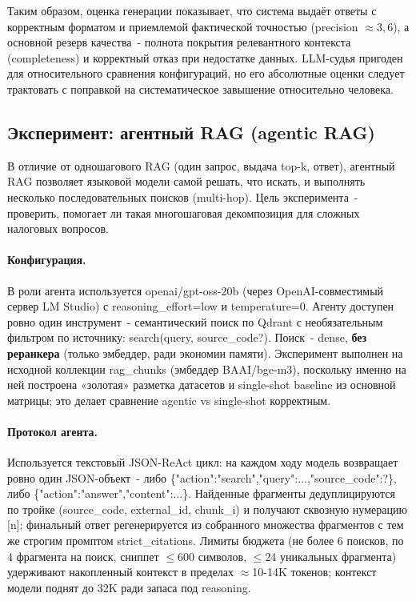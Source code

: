 \documentclass[a4paper,12pt]{article}
\begin{document}
Таким образом, оценка генерации показывает, что система выдаёт ответы с корректным форматом и приемлемой фактической точностью (precision $\approx 3{,}6$), а основной резерв качества~- полнота покрытия релевантного контекста (completeness) и корректный отказ при недостатке данных. LLM-судья пригоден для относительного сравнения конфигураций, но его абсолютные оценки следует трактовать с поправкой на систематическое завышение относительно человека.

\subsection{Эксперимент: агентный RAG (agentic RAG)}
\label{sec:agentic}

В отличие от одношагового RAG (один запрос, выдача top-k, ответ), агентный RAG позволяет языковой модели самой решать, что искать, и выполнять несколько последовательных поисков (multi-hop). Цель эксперимента~- проверить, помогает ли такая многошаговая декомпозиция для сложных налоговых вопросов.

\paragraph{Конфигурация.} В роли агента используется openai/gpt-oss-20b (через OpenAI-совместимый сервер LM Studio) с reasoning\_effort=low и temperature=0. Агенту доступен ровно один инструмент~- семантический поиск по Qdrant с необязательным фильтром по источнику: search(query, source\_code?). Поиск~- dense, \textbf{без реранкера} (только эмбеддер, ради экономии памяти). Эксперимент выполнен на исходной коллекции rag\_chunks (эмбеддер BAAI/bge-m3), поскольку именно на ней построена «золотая» разметка датасетов и single-shot baseline из основной матрицы; это делает сравнение agentic vs single-shot корректным.

\paragraph{Протокол агента.} Используется текстовый JSON-ReAct цикл: на каждом ходу модель возвращает ровно один JSON-объект~- либо \{"action":"search","query":...,"source\_code":?\}, либо \{"action":"answer","content":...\}. Найденные фрагменты дедуплицируются по тройке (source\_code, external\_id, chunk\_i) и получают сквозную нумерацию [n]; финальный ответ регенерируется из собранного множества фрагментов с тем же строгим промптом strict\_citations. Лимиты бюджета (не более 6 поисков, по 4 фрагмента на поиск, сниппет $\le$600 символов, $\le$24 уникальных фрагмента) удерживают накопленный контекст в пределах $\approx$10-14K токенов; контекст модели поднят до 32K ради запаса под reasoning.
\end{document}
